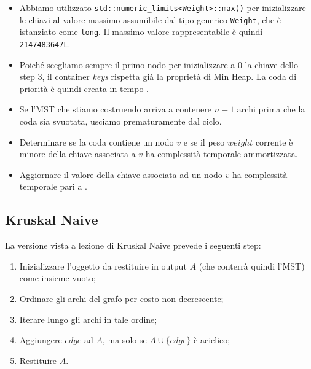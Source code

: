 \begin{itemize}
    \item Abbiamo utilizzato \texttt{std::numeric_limits<Weight>::max()} per inizializzare le chiavi al valore massimo assumibile dal tipo generico \texttt{Weight}, che è istanziato come \texttt{long}. Il massimo valore rappresentabile è quindi \texttt{2147483647L}. \\

    \item Poiché scegliamo sempre il primo nodo per inizializzare a 0 la chiave dello step 3, il container \textit{keys} rispetta già la proprietà di Min Heap. La coda di priorità è quindi creata in tempo \complexityConstant{}. \\

    \item Se l'MST che stiamo costruendo arriva a contenere $n - 1$ archi prima che la coda sia svuotata, usciamo prematuramente dal ciclo. \\

    \item Determinare se la coda contiene un nodo $v$ e se il peso $weight$ corrente è minore della chiave associata a $v$ ha complessità temporale \complexityConstant{} ammortizzata.\\

    \item Aggiornare il valore della chiave associata ad un nodo $v$ ha complessità temporale pari a \complexityLogN{}.\\
\end{itemize}


\subsection{Kruskal Naive}

La versione vista a lezione di Kruskal Naive prevede i seguenti step:

\begin{enumerate}
    \item Inizializzare l'oggetto da restituire in output $A$ (che conterrà quindi l'MST) come insieme vuoto;
    \item Ordinare gli archi del grafo per costo non decrescente;
    \item Iterare lungo gli archi in tale ordine;
    \item Aggiungere $edge$ ad $A$, ma solo se $A \cup \{ edge \}$ è aciclico;
    \item Restituire $A$.
\end{enumerate}

